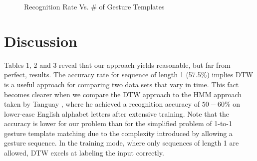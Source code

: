 \documentclass[twoside]{article}
\begin{document}
\begin{multicols}{2}
\begin{figure}[H]
\centering
{}	
	\caption{Recognition Rate Vs. \# of Gesture Templates}
	\label{fig3}
\end{figure}
\section{Discussion}


Tables 1, 2 and 3 reveal that our approach yields reasonable, but far from
perfect, results. The accuracy rate for sequence of length 1 (57.5\%) implies
DTW is a useful approach for comparing two data sets that vary in time.
This fact becomes clearer when we compare the DTW approach to the HMM approach
taken by Tanguay \cite{tanguay_jr_hidden_1995}, where he achieved a recognition
accuracy of $50-60\%$ on lower-case English alphabet letters after extensive
training. Note that the accuracy is lower for our problem than for the
simplified problem of 1-to-1 gesture template matching due to the complexity
introduced by allowing a gesture sequence. In the training mode, where only sequences of
length 1 are allowed, DTW excels at labeling the input correctly.


\end{multicols}
\end{document}
